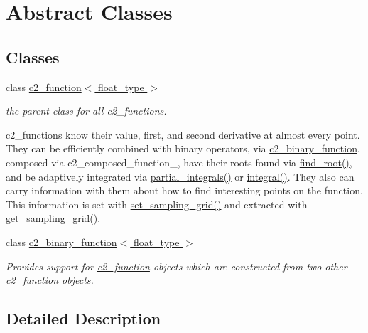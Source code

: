 \hypertarget{group__abstract__classes}{}\section{Abstract Classes}
\label{group__abstract__classes}
\subsection*{Classes}
\begin{DoxyCompactItemize}
\item 
class \hyperlink{classc2__function}{c2\+\_\+function$<$ float\+\_\+type $>$}
\begin{DoxyCompactList}\small\item\em the parent class for all c2\+\_\+functions.

c2\+\_\+functions know their value, first, and second derivative at almost every point. They can be efficiently combined with binary operators, via \hyperlink{classc2__binary__function}{c2\+\_\+binary\+\_\+function}, composed via c2\+\_\+composed\+\_\+function\+\_\+, have their roots found via \hyperlink{classc2__function_acd17a7191226578c866d82cb2e9ff89f}{find\+\_\+root()}, and be adaptively integrated via \hyperlink{classc2__function_a89ce5e2f44ebfaf9eb4d66605cde4fde}{partial\+\_\+integrals()} or \hyperlink{classc2__function_a675c5056562332be2e49b38485d322b7}{integral()}. They also can carry information with them about how to find \textquotesingle{}interesting\textquotesingle{} points on the function. This information is set with \hyperlink{classc2__function_a23828c75121b442899ab7a80cf5abbb0}{set\+\_\+sampling\+\_\+grid()} and extracted with \hyperlink{classc2__function_ad03264dcc015e5d0b1b6eb30df3f32be}{get\+\_\+sampling\+\_\+grid()}. \end{DoxyCompactList}\item 
class \hyperlink{classc2__binary__function}{c2\+\_\+binary\+\_\+function$<$ float\+\_\+type $>$}
\begin{DoxyCompactList}\small\item\em Provides support for \hyperlink{classc2__function}{c2\+\_\+function} objects which are constructed from two other \hyperlink{classc2__function}{c2\+\_\+function} objects. \end{DoxyCompactList}\end{DoxyCompactItemize}


\subsection{Detailed Description}
